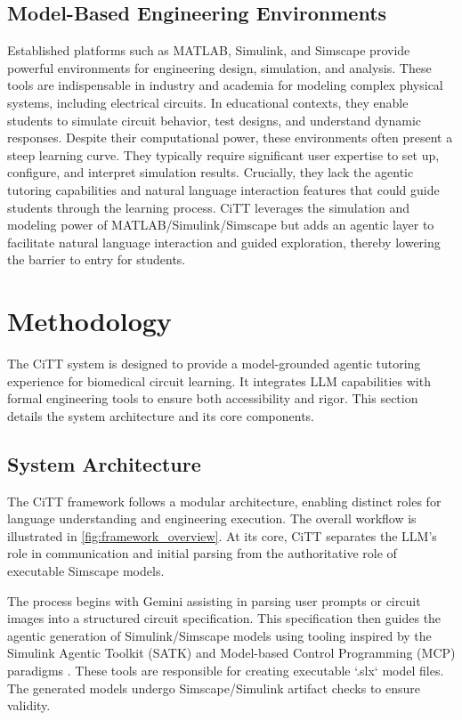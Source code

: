 \documentclass[10pt,twocolumn,letterpaper]{article}
\begin{document}
\subsection{Model-Based Engineering Environments}
Established platforms such as MATLAB, Simulink, and Simscape \cite{mathworks_matlab, mathworks_simulink, mathworks_simscape} provide powerful environments for engineering design, simulation, and analysis. These tools are indispensable in industry and academia for modeling complex physical systems, including electrical circuits. In educational contexts, they enable students to simulate circuit behavior, test designs, and understand dynamic responses. Despite their computational power, these environments often present a steep learning curve. They typically require significant user expertise to set up, configure, and interpret simulation results. Crucially, they lack the agentic tutoring capabilities and natural language interaction features that could guide students through the learning process. CiTT leverages the simulation and modeling power of MATLAB/Simulink/Simscape but adds an agentic layer to facilitate natural language interaction and guided exploration, thereby lowering the barrier to entry for students.

\section{Methodology}
\label{sec:method}
The CiTT system is designed to provide a model-grounded agentic tutoring experience for biomedical circuit learning. It integrates LLM capabilities with formal engineering tools to ensure both accessibility and rigor. This section details the system architecture and its core components.

\subsection{System Architecture}
\label{sec:method_architecture}
The CiTT framework follows a modular architecture, enabling distinct roles for language understanding and engineering execution. The overall workflow is illustrated in \cref{fig:framework_overview}. At its core, CiTT separates the LLM's role in communication and initial parsing from the authoritative role of executable Simscape models.

The process begins with Gemini \cite{gemini_api_docs} assisting in parsing user prompts or circuit images into a structured circuit specification. This specification then guides the agentic generation of Simulink/Simscape models using tooling inspired by the Simulink Agentic Toolkit (SATK) and Model-based Control Programming (MCP) paradigms \cite{mathworks_satk, matlab_agentic_toolkit}. These tools are responsible for creating executable `.slx` model files. The generated models undergo Simscape/Simulink artifact checks to ensure validity.
\end{document}
